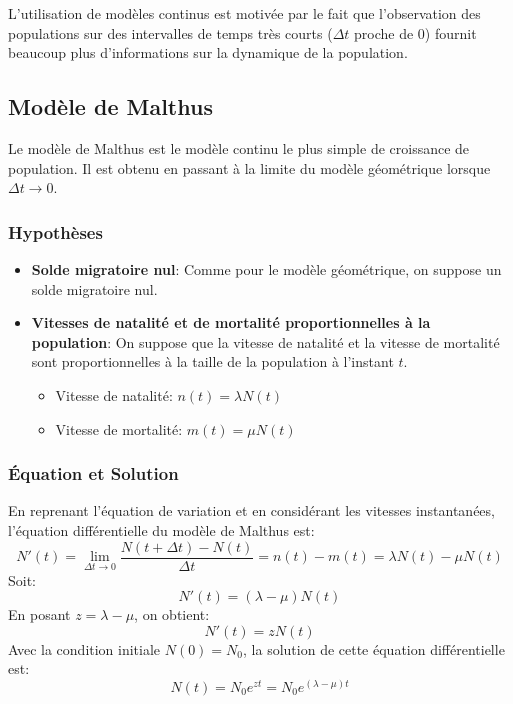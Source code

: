\documentclass[oneside]{book}
\begin{document}
\begin{remark}
L'utilisation de modèles continus est motivée par le fait que l'observation des populations sur des intervalles de temps très courts ($\Delta t$ proche de 0) fournit beaucoup plus d'informations sur la dynamique de la population.
\end{remark}


\subsection{Modèle de Malthus}

Le modèle de Malthus est le modèle continu le plus simple de croissance de population. Il est obtenu en passant à la limite du modèle géométrique lorsque $\Delta t \to 0$.

\subsubsection{Hypothèses}

\begin{itemize}
    \item \textbf{Solde migratoire nul}: Comme pour le modèle géométrique, on suppose un solde migratoire nul.
    \item \textbf{Vitesses de natalité et de mortalité proportionnelles à la population}: On suppose que la vitesse de natalité et la vitesse de mortalité sont proportionnelles à la taille de la population à l'instant $t$.
    \begin{itemize}
        \item Vitesse de natalité: $n(t) = \lambda N(t)$
        \item Vitesse de mortalité: $m(t) = \mu N(t)$
    \end{itemize}
\end{itemize}

\subsubsection{Équation et Solution}
\begin{proposition}
En reprenant l'équation de variation et en considérant les vitesses instantanées, l'équation différentielle du modèle de Malthus est:
\[
N'(t) = \lim_{\Delta t \to 0} \frac{N(t + \Delta t) - N(t)}{\Delta t} = n(t) - m(t) = \lambda N(t) - \mu N(t)
\]
Soit:
\[
N'(t) = (\lambda - \mu) N(t)
\]
En posant $z = \lambda - \mu$, on obtient:
\[
N'(t) = z N(t)
\]
Avec la condition initiale $N(0) = N_0$, la solution de cette équation différentielle est:
\[
N(t) = N_0 e^{zt} = N_0 e^{(\lambda - \mu)t}
\]
\end{proposition}
\end{document}
